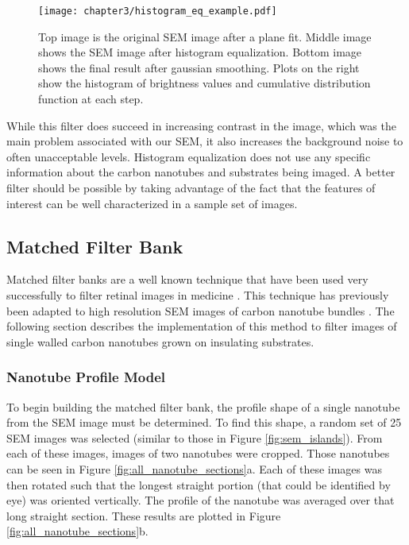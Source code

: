 \begin{figure}
	\centering
	\texttt{[image: chapter3/histogram\_eq\_example.pdf]}
	\caption{Top image is the original SEM image after a plane fit. Middle image shows the SEM image after histogram equalization. Bottom image shows the final result after gaussian smoothing. Plots on the right show the histogram of brightness values and cumulative distribution function at each step.}
	\label{fig:hist_eq_data}
\end{figure}

While this filter does succeed in increasing contrast in the image, which was the main problem associated with our SEM, it also increases the background noise to often unacceptable levels. Histogram equalization does not use any specific information about the carbon nanotubes and substrates being imaged. A better filter should be possible by taking advantage of the fact that the features of interest can be well characterized in a sample set of images. 

\subsection{Matched Filter Bank}

Matched filter banks are a well known technique that have been used very successfully to filter retinal images in medicine \cite{Chaudhuri1989}. This technique has previously been adapted to high resolution SEM images of carbon nanotube bundles \cite{Guerrero2014}. The following section describes the implementation of this method to filter images of single walled carbon nanotubes grown on insulating substrates. 

\subsubsection{Nanotube Profile Model}

To begin building the matched filter bank, the profile shape of a single nanotube from the SEM image must be determined. To find this shape, a random set of 25 SEM images was selected (similar to those in Figure \ref{fig:sem_islands}). From each of these images, images of two nanotubes were cropped. Those nanotubes can be seen in Figure \ref{fig:all_nanotube_sections}a. Each of these images was then rotated such that the longest straight portion (that could be identified by eye) was oriented vertically. The profile of the nanotube was averaged over that long straight section. These results are plotted in Figure \ref{fig:all_nanotube_sections}b.

